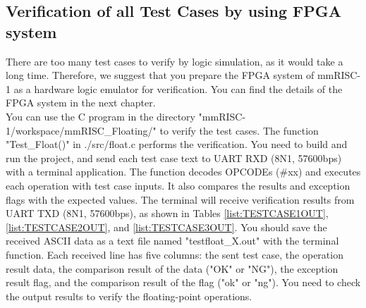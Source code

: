 \begin{description}
\begin{table}[H]
    \caption{Exception Flag in Test Case File}
    \label{tb:TESTCASEFLAG}
\end{table}

\end{description}



\subsection{Verification of all Test Cases by using FPGA system}
There are too many test cases to verify by logic simulation, as it would take a long time. Therefore, we suggest that you prepare the FPGA system of mmRISC-1 as a hardware logic emulator for verification. You can find the details of the FPGA system in the next chapter.\\

You can use the C program in the directory "mmRISC-1/workspace/mmRISC\_Floating/" to verify the test cases. The function "Test\_Float()" in ./src/float.c performs the verification. You need to build and run the project, and send each test case text to UART RXD (8N1, 57600bps) with a terminal application. The function decodes OPCODEs (\#xx) and executes each operation with test case inputs. It also compares the results and exception flags with the expected values. The terminal will receive verification results from UART TXD (8N1, 57600bps), as shown in Tables \ref{list:TESTCASE1OUT}, \ref{list:TESTCASE2OUT}, and \ref{list:TESTCASE3OUT}. You should save the received ASCII data as a text file named "testfloat\_X.out" with the terminal function. Each received line has five columns: the sent test case, the operation result data, the comparison result of the data ("OK" or "NG"), the exception result flag, and the comparison result of the flag ("ok" or "ng"). You need to check the output results to verify the floating-point operations.\\\\

